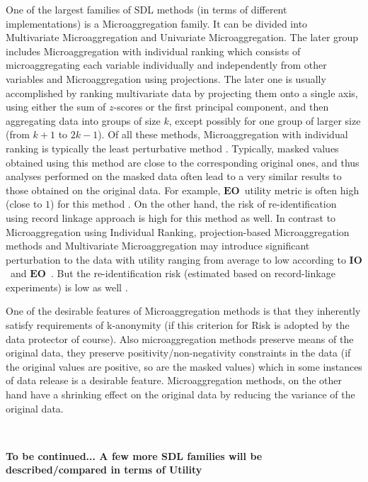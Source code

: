 \documentclass[12pt]{article}
\def\IO{\ensuremath{\mathbf{IO}}} %
\def\EO{\ensuremath{\mathbf{EO}}} %
\begin{document}
One of the largest families of SDL methods (in terms of different  implementations) is a  Microaggregation family. It can   be divided into Multivariate Microaggregation   and  Univariate Microaggregation. The later group includes Microaggregation with individual ranking which consists of microaggregating each variable individually and independently from other variables and Microaggregation using projections. The later one is usually accomplished by ranking  multivariate data by projecting them onto a single axis, using either the sum of $z$-scores or the first principal component, and then aggregating data into groups of size $k$, except possibly for one group of larger size (from $k+1$ to $2k -1$).
Of all these methods, Microaggregation with individual ranking is typically the least perturbative method \citep{kkors06}. Typically, masked values obtained using this method are close to the corresponding original ones, and thus analyses performed on the masked data often lead to a very similar results to those obtained on the original data. For example, \EO\ utility metric is often high (close to $1$)  for this method \citep{kkors06}. On the other hand, the risk of re-identification using record linkage approach is high for this method as well. 
In contrast to Microaggregation using Individual Ranking, projection-based Microaggregation methods and Multivariate Microaggregation may introduce significant perturbation to the data with utility ranging from average to low according to \IO\ and \EO\ . But the re-identification risk (estimated based on record-linkage experiments) is low as well \citep{}. 

One of the desirable features of Microaggregation methods is that they  inherently satisfy requirements of k-anonymity (if this criterion for Risk  is adopted by the data protector of course). Also microaggregation methods preserve means of the original data, they preserve positivity/non-negativity  constraints in the data (if the original values are positive, so are the masked values)  which in some instances of data release  is a desirable feature. Microaggregation methods, on the other hand have a shrinking effect on the original data by reducing  the variance of the original data.
 
 $ $ 

{\bf To be continued... A few more SDL families will be described/compared in terms of Utility}
 
 


\def\thisfile{times_tpl-new.tex}
\def\thisfiledate{2020/03/18}
\typeout{***** `\thisfile' <\thisfiledate> *****}
\end{document}

